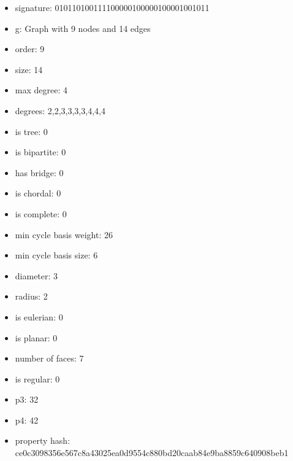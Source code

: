 \begin{figure}
\end{figure}
\begin{itemize}
\item signature: 010110100111100000100000100001001011
\item g: Graph with 9 nodes and 14 edges
\item order: 9
\item size: 14
\item max degree: 4
\item degrees: 2,2,3,3,3,3,4,4,4
\item is tree: 0
\item is bipartite: 0
\item has bridge: 0
\item is chordal: 0
\item is complete: 0
\item min cycle basis weight: 26
\item min cycle basis size: 6
\item diameter: 3
\item radius: 2
\item is eulerian: 0
\item is planar: 0
\item number of faces: 7
\item is regular: 0
\item p3: 32
\item p4: 42
\item property hash: ce0c3098356e567c8a43025ea0d9554c880bd20caab84e9ba8859c640908beb1
\end{itemize}
\newpage
